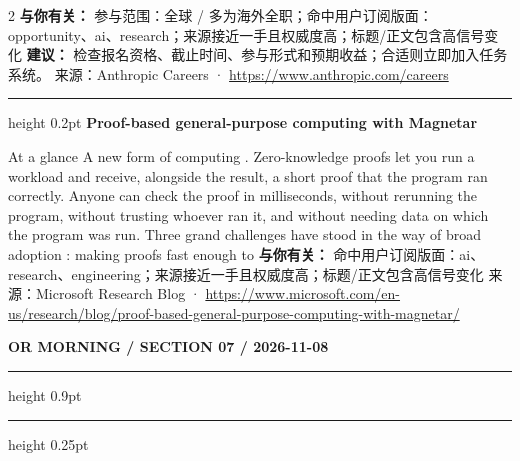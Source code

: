 \documentclass[10.5pt]{ctexart}
\begin{document}
\begin{multicols}{2}
\textbf{与你有关：} 参与范围：全球 / 多为海外全职；命中用户订阅版面：opportunity、ai、research；来源接近一手且权威度高；标题/正文包含高信号变化
\textbf{建议：} 检查报名资格、截止时间、参与形式和预期收益；合适则立即加入任务系统。
{\footnotesize\color{ormuted} 来源：Anthropic Careers · \url{https://www.anthropic.com/careers}}
\vspace{2mm}
\hrule height 0.2pt
\vspace{2mm}
{\large\bfseries Proof-based general-purpose computing with Magnetar}\par
At a glance A new form of computing . Zero-knowledge proofs let you run a workload and receive, alongside the result, a short proof that the program ran correctly. Anyone can check the proof in milliseconds, without rerunning the program, without trusting whoever ran it, and without needing data on which the program was run. Three grand challenges have stood in the way of broad adoption : making proofs fast enough to
\textbf{与你有关：} 命中用户订阅版面：ai、research、engineering；来源接近一手且权威度高；标题/正文包含高信号变化
{\footnotesize\color{ormuted} 来源：Microsoft Research Blog · \url{https://www.microsoft.com/en-us/research/blog/proof-based-general-purpose-computing-with-magnetar/}}
\end{multicols}
\newpage
{\small\bfseries OR MORNING / SECTION 07 / 2026-11-08}
\vspace{2mm}
\hrule height 0.9pt
\vspace{1.5mm}
\hrule height 0.25pt
\vspace{4mm}
\end{document}
